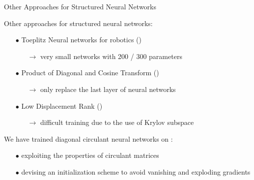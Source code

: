 \begin{frame}{Other Approaches for Structured Neural Networks}

  Other approaches for structured neural networks:
  \begin{itemize}
    \item[$\bullet$] Toeplitz Neural networks for robotics ({})
    \begin{itemize}
      \item[$\rightarrow$] \small{very small networks with 200 / 300 parameters}
    \end{itemize}
    \item[$\bullet$] Product of Diagonal and Cosine Transform ({})
    \begin{itemize}
      \item[$\rightarrow$] \small{only replace the last layer of neural networks}
    \end{itemize}
    \item[$\bullet$] Low Displacement Rank ({})
    \begin{itemize}
      \item[$\rightarrow$] \small{difficult training due to the use of Krylov subspace}
    \end{itemize}
  \end{itemize}

  \vspace{0.5cm}


  \pause
  \begin{mdframed}[linecolor=OrangePSL,linewidth=1pt]
    We have trained diagonal circulant neural networks on :
    \vspace{-0.2cm}
    \begin{itemize}[leftmargin=7pt]
      \item[$\bullet$] exploiting the properties of circulant matrices
      \item[$\bullet$] devising an initialization scheme to avoid vanishing and exploding gradients
    \end{itemize}
  \end{mdframed}


\end{frame}



